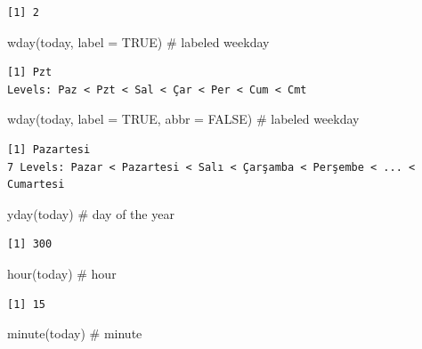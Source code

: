 \documentclass[
  letterpaper,
  DIV=11,
  numbers=noendperiod]{scrreprt}
\newenvironment{Shaded}{\begin{snugshade}}{\end{snugshade}}
\newcommand{\AttributeTok}[1]{\textcolor[rgb]{0.40,0.45,0.13}{#1}}
\newcommand{\CommentTok}[1]{\textcolor[rgb]{0.37,0.37,0.37}{#1}}
\newcommand{\ConstantTok}[1]{\textcolor[rgb]{0.56,0.35,0.01}{#1}}
\newcommand{\FunctionTok}[1]{\textcolor[rgb]{0.28,0.35,0.67}{#1}}
\newcommand{\NormalTok}[1]{\textcolor[rgb]{0.00,0.23,0.31}{#1}}
\begin{document}
\begin{verbatim}
[1] 2
\end{verbatim}

\begin{Shaded}
\begin{Highlighting}[]
\FunctionTok{wday}\NormalTok{(today, }\AttributeTok{label =} \ConstantTok{TRUE}\NormalTok{) }\CommentTok{\# labeled weekday}
\end{Highlighting}
\end{Shaded}

\begin{verbatim}
[1] Pzt
Levels: Paz < Pzt < Sal < Çar < Per < Cum < Cmt
\end{verbatim}

\begin{Shaded}
\begin{Highlighting}[]
\FunctionTok{wday}\NormalTok{(today, }\AttributeTok{label =} \ConstantTok{TRUE}\NormalTok{, }\AttributeTok{abbr =} \ConstantTok{FALSE}\NormalTok{) }\CommentTok{\# labeled weekday}
\end{Highlighting}
\end{Shaded}

\begin{verbatim}
[1] Pazartesi
7 Levels: Pazar < Pazartesi < Salı < Çarşamba < Perşembe < ... < Cumartesi
\end{verbatim}

\begin{Shaded}
\begin{Highlighting}[]
\FunctionTok{yday}\NormalTok{(today) }\CommentTok{\# day of the year}
\end{Highlighting}
\end{Shaded}

\begin{verbatim}
[1] 300
\end{verbatim}

\begin{Shaded}
\begin{Highlighting}[]
\FunctionTok{hour}\NormalTok{(today) }\CommentTok{\# hour}
\end{Highlighting}
\end{Shaded}

\begin{verbatim}
[1] 15
\end{verbatim}

\begin{Shaded}
\begin{Highlighting}[]
\FunctionTok{minute}\NormalTok{(today) }\CommentTok{\# minute}
\end{Highlighting}
\end{Shaded}
\end{document}
